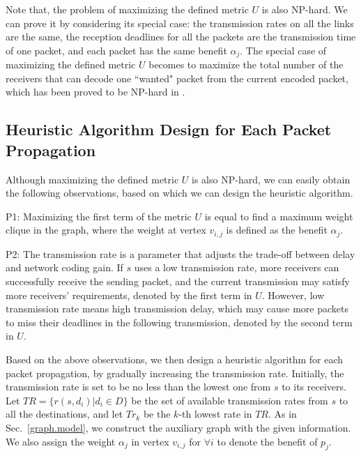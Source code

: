 \documentclass[journal]{IEEEtran}
\begin{document}
Note that, the problem of maximizing the defined metric $U$ is also NP-hard. We can prove it by considering its special case: the transmission rates on all the links are the same,  the reception deadlines for all the packets are the transmission time of one packet, and each packet has the same benefit $\alpha_j$. The special case of maximizing the defined metric $U$ becomes to maximize the total number of the receivers that can decode one ``wanted" packet from the current encoded packet, which has been proved to be NP-hard in \cite{XiuminWang2010}.

\vspace{-0.1in}
\subsection{Heuristic Algorithm Design for Each Packet Propagation}\label{Sec.algorithm.design}
Although maximizing the defined metric $U$ is also NP-hard, we can easily obtain the following observations, based on which we can design the heuristic algorithm.

P1: Maximizing the first term of the metric $U$ is equal to find a maximum weight clique in the graph, where the weight at vertex $v_{i,j}$ is defined as the benefit $\alpha_j$.

P2: The transmission rate is a parameter that adjusts the trade-off between delay and network coding gain. If $s$ uses a low transmission rate, more receivers can successfully receive the sending packet, and the current transmission may satisfy more receivers' requirements, denoted by the first term in $U$. However, low transmission rate means high transmission delay, which may cause more packets to miss their deadlines in the following transmission, denoted by the second term in $U$.

Based on the above observations, we then design a heuristic algorithm for each packet propagation, by gradually increasing the transmission rate. Initially, the transmission rate is set to be no less than the lowest one from $s$ to its receivers. Let $TR=\{r(s,d_i)|d_i\in D\}$ be the set of available transmission rates from $s$ to all the destinations, and let $Tr_k$ be the $k$-th lowest rate in $TR$. As in Sec.~\ref{graph.model}, we construct the auxiliary graph with the given information. We also assign the weight $\alpha_{j}$ in vertex $v_{i,j}$ for $\forall i$ to denote the benefit of $p_j$.
\end{document}
